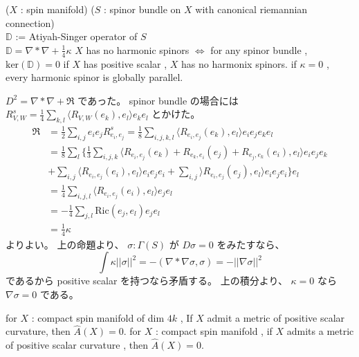 \begin{Theorem}
\itemprop
  \For (\(X\) : spin manifold) (\(S\) : spinor bundle on \(X\) with canonical riemannian connection) \\
  \Let \(\mathbb{D}\) := Atiyah-Singer operator of \(S\) \\
  \Then \(\mathbb{D} = \nabla * \nabla + \frac{1}{4} \kappa\)
\itemdefi
  \(X\) has no harmonic spinors \(\iff\) for any spinor bundle , \(\text{ker}(\mathbb{D}) = 0\)
\itemprop
  if \(X\) has positive scalar , \(X\) has no harmonix spinors.
\itemprop
  if \(\kappa = 0\) , every harmonic spinor is globally parallel. 
\end{Theorem}

\begin{Proof}
\itemprof
  \(D^2 = \nabla*\nabla + \mathfrak{R} \) であった。
  spinor bundle の場合には \(R^s_{V,W} = \frac{1}{4}\sum_{k,l}\langle R_{V,W}(e_k),e_l\rangle e_k e_l\) とかけた。
  \begin{align*}
    \mathfrak{R}
    &= \frac{1}{2} \sum_{i,j} e_i e_j R^s_{e_i,e_j}
    = \frac{1}{8} \sum_{i,j,k,l} \langle R_{e_i,e_j}(e_k),e_l \rangle e_i e_j e_k e_l \\
    &= \frac{1}{8} \sum_l \{
    \frac{1}{3} \sum_{i,j,k}
    \langle R_{e_i,e_j} (e_k) + R_{e_k,e_i} (e_j) + R_{e_j,e_k} (e_i) , e_l \rangle e_i e_j e_k \\
    & + \sum_{i,j} \langle R_{e_i,e_j}(e_i),e_l \rangle e_i e_j e_i
    + \sum_{i,j} \rangle R_{e_i,e_j}(e_j),e_l \rangle e_i e_j e_i
    \} e_l \\
    &= \frac{1}{4} \sum_{i,j,l} \langle R_{e_i,e_j}(e_i),e_l\rangle e_j e_l \\
    &= - \frac{1}{4} \sum_{j,l}\text{Ric}(e_j,e_l) e_j e_l \\
    &= \frac{1}{4} \kappa
  \end{align*}
  よりよい。
\itemprof
  上の命題より、 \(\sigma : \Gamma(S)\) が \(D \sigma = 0\) をみたすなら、
  \[\int \kappa ||\sigma||^2 = - (\nabla*\nabla \sigma , \sigma) = - ||\nabla\sigma||^2\]
  であるから positive scalar を持つなら矛盾する。
\itemprof
  上の積分より、 \(\kappa = 0\) なら \(\nabla \sigma = 0\) である。
\end{Proof}

\begin{Theorem}
\itemprop
  for \(X\) : compact spin manifold of dim \(4k\) , If \(X\) admit a metric of positive scalar curvature, then \(\hat{A}(X) = 0\).
\itemprop
  for \(X\) : compact spin manifold , if \(X\) admits a metric of positive scalar curvature , then \(\hat{A}(X) = 0\).
\end{Theorem}

